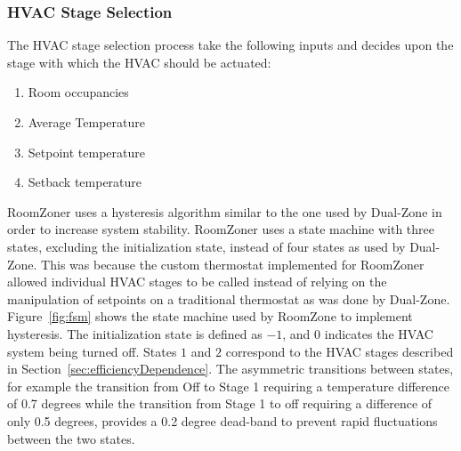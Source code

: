 \subsubsection{HVAC Stage Selection}
\label{sec:hvacStageSelection}
The HVAC stage selection process take the following inputs and decides upon the
stage with which the HVAC should be actuated:
\begin{enumerate}
\item Room occupancies
\item Average Temperature
\item Setpoint temperature
\item Setback temperature
\end{enumerate}
RoomZoner uses a hysteresis algorithm similar to the one used by Dual-Zone in
order to increase system stability. RoomZoner uses a state machine with three
states, excluding the initialization state, instead of four states as used by
Dual-Zone. This was because the custom thermostat implemented for RoomZoner
allowed individual HVAC stages to be called instead of relying on the
manipulation of setpoints on a traditional thermostat as was done by Dual-Zone.
Figure~\ref{fig:fsm} shows the state machine used by RoomZone to implement
hysteresis. The initialization state is defined as $-1$, and $0$ indicates the
HVAC system being turned off. States $1$ and $2$ correspond to the HVAC stages
described in Section~\ref{sec:efficiencyDependence}. The asymmetric transitions
between states, for example the transition from Off to Stage 1 requiring a
temperature difference of 0.7 degrees while the transition from Stage 1 to off
requiring a difference of only 0.5 degrees, provides a 0.2 degree dead-band to
prevent rapid fluctuations between the two states.

\begin{figure}[!htb]
\end{figure}

